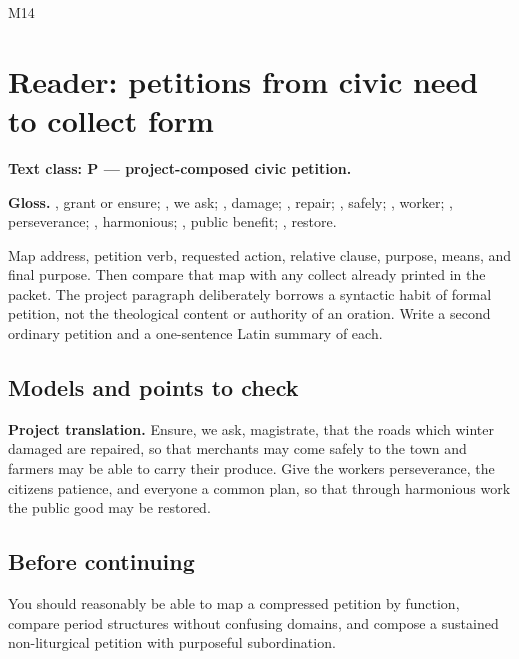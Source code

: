 \begin{courseunit}{M14}
\chapter{Reader: petitions from civic need to collect form}

\textbf{Text class: P --- project-composed civic petition.}


\textbf{Gloss.} , grant or ensure; , we ask;
, damage; , repair; , safely;
, worker; , perseverance;
, harmonious; , public benefit;
, restore.

Map address, petition verb, requested action, relative clause, purpose, means,
and final purpose.  Then compare that map with any collect already printed in
the packet.  The project paragraph deliberately borrows a syntactic habit of
formal petition, not the theological content or authority of an oration.
Write a second ordinary petition and a one-sentence Latin summary of each.

\ifsolutions
\section{Models and points to check}
\textbf{Project translation.} Ensure, we ask, magistrate, that the roads which
winter damaged are repaired, so that merchants may come safely to the town and
farmers may be able to carry their produce. Give the workers perseverance, the
citizens patience, and everyone a common plan, so that through harmonious work
the public good may be restored.
\else
\section{Before continuing}
You should reasonably be able to map a compressed petition by function,
compare period structures without confusing domains, and compose a sustained
non-liturgical petition with purposeful subordination.
\fi
\end{courseunit}

